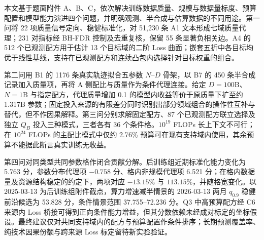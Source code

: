 本文基于题面附件 A、B、C，依次解决训练数据质量、规模与数据量标度、预算配置和模型能力演进四个问题，并明确观测、半合成与估算数据的不同用途。第一问将 22 项质量信号定向、稳健标准化，对 51,230 条 A1 文本形成七域质量代理；231 对指标经 BH-FDR 控制及去重复核，保留 55 条显著负相关边。A4 的 512 个已观测配方用于估计 13 个目标域的二阶 Loss 曲面；嵌套五折中各目标均优于线性基线，支持在已观测配方和连续凸包内选择针对目标权重的组合。

第二问用 B1 的 1176 条真实轨迹拟合五参数 $N$--$D$ 骨架，以 B7 的 450 条半合成记录加入质量项，再将 A 侧配比与质量作为条件代理连接。给定 $D=100$B、$N=1$B 与指定配方，代理质量增加 0.1 的模型内收益等价于原质量下扩至约 1.317B 参数；固定投入来源的有限差分同时识别出部分领域组合的操作性互补与替代，但不作因果解释。第三问分别求解固定配方、87 个已观测配方联立选择及独立 $Q_B$ 投入三种模式，三者各有 36 个条件格。$10^{19}$ FLOPs 长上下文不可行；在 $10^{24}$ FLOPs 的主配比模式中仅约 2.76\% 预算可在现有支持域内使用，其余预算不能据此断言真实训练无收益。

第四问对同类型共同参数格作闭合贡献分解。后训练组近期标准化能力变化为 5.763 分，参数分布代理项 $-0.758$ 分、格内非规模代理项 6.521 分；在格内数据量及资源结构稳定的约定下，两项对应 $-13.15\%$ 与 $113.15\%$，并随格宽变化。以 2025-03-13 为后训练组附件截点，算力增速减半情景的 2026-03-13 两月 $q_{0.9}$ 稳健前沿候选为 53.828 分，条件情景范围 37.755--72.236 分。Q3 中高预算配方经 C6 来源内 Loss 桥接可得到正向条件能力增益，但其分数依赖未经成对标定的坐标假设。最终建议仅对共同支持域内的配方与预算配置作条件排序；长期预测覆盖率、纯技术因果份额与跨来源 Loss 标定留待新实验验证。

